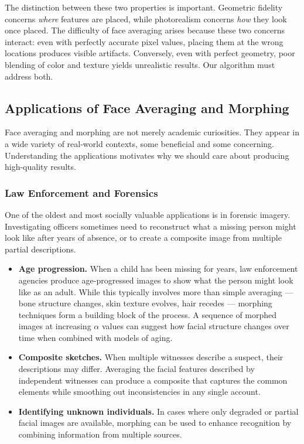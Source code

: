 The distinction between these two properties is important. Geometric fidelity concerns
\emph{where} features are placed, while photorealism concerns \emph{how} they look once placed.
The difficulty of face averaging arises because these two concerns interact: even with
perfectly accurate pixel values, placing them at the wrong locations produces visible artifacts.
Conversely, even with perfect geometry, poor blending of color and texture yields unrealistic
results. Our algorithm must address both.


\subsection{Applications of Face Averaging and Morphing}

Face averaging and morphing are not merely academic curiosities. They appear in a wide variety of
real-world contexts, some beneficial and some concerning. Understanding the applications motivates
why we should care about producing high-quality results.


\subsubsection{Law Enforcement and Forensics}

One of the oldest and most socially valuable applications is in forensic imagery.
Investigating officers sometimes need to reconstruct what a missing person might look like after
years of absence, or to create a composite image from multiple partial descriptions.

\begin{itemize}
    \item \textbf{Age progression.} When a child has been missing for years, law enforcement
    agencies produce age-progressed images to show what the person might look like as an adult.
    While this typically involves more than simple averaging --- bone structure changes, skin
    texture evolves, hair recedes --- morphing techniques form a building block of the process.
    A sequence of morphed images at increasing $\alpha$ values can suggest how facial structure
    changes over time when combined with models of aging.

    \item \textbf{Composite sketches.} When multiple witnesses describe a suspect, their
    descriptions may differ. Averaging the facial features described by independent witnesses
    can produce a composite that captures the common elements while smoothing out inconsistencies
    in any single account.

    \item \textbf{Identifying unknown individuals.} In cases where only degraded or partial
    facial images are available, morphing can be used to enhance recognition by combining
    information from multiple sources.
\end{itemize}


